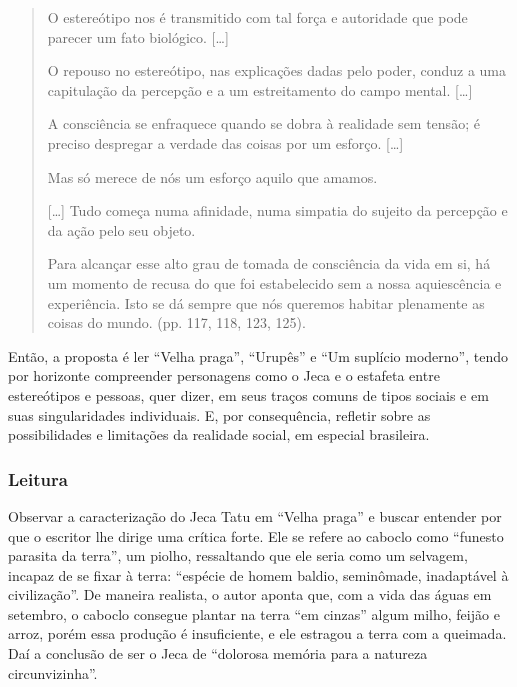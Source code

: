 \documentclass[11pt]{extarticle}
\begin{document}
\begin{quote}
O estereótipo nos é transmitido com tal força e autoridade que pode
parecer um fato biológico. {[}\ldots{}{]}

O repouso no estereótipo, nas explicações dadas pelo poder, conduz a uma
capitulação da percepção e a um estreitamento do campo mental.
{[}\ldots{}{]}

A consciência se enfraquece quando se dobra à realidade sem tensão; é
preciso despregar a verdade das coisas por um esforço. {[}\ldots{}{]}

Mas só merece de nós um esforço aquilo que amamos.

{[}\ldots{}{]} Tudo começa numa afinidade, numa simpatia do sujeito da
percepção e da ação pelo seu objeto.

Para alcançar esse alto grau de tomada de consciência da vida em si, há
um momento de recusa do que foi estabelecido sem a nossa aquiescência e
experiência. Isto se dá sempre que nós queremos habitar plenamente as
coisas do mundo. (pp. 117, 118, 123, 125).
\end{quote}

Então, a proposta é ler ``Velha praga'', ``Urupês'' e ``Um suplício
moderno'', tendo por horizonte compreender personagens como o Jeca e o
estafeta entre estereótipos e pessoas, quer dizer, em seus traços comuns
de tipos sociais e em suas singularidades individuais. E, por
consequência, refletir sobre as possibilidades e limitações da realidade
social, em especial brasileira.


\subsubsection{Leitura}

Observar a caracterização do Jeca Tatu em ``Velha praga'' e buscar
entender por que o escritor lhe dirige uma crítica forte. Ele se refere
ao caboclo como ``funesto parasita da terra'', um piolho, ressaltando
que ele seria como um selvagem, incapaz de se fixar à terra: ``espécie
de homem baldio, seminômade, inadaptável à civilização''. De maneira
realista, o autor aponta que, com a vida das águas em setembro, o
caboclo consegue plantar na terra ``em cinzas'' algum milho, feijão e
arroz, porém essa produção é insuficiente, e ele estragou a terra com a
queimada. Daí a conclusão de ser o Jeca de ``dolorosa memória para a
natureza circunvizinha''.
\end{document}
